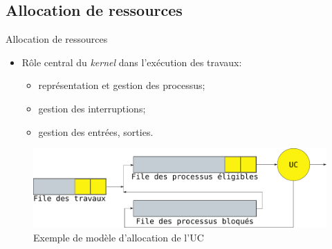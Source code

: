 \begin{frame}{\sectitle}

\def\subsectitle{Allocation de ressources}
\subsection{\subsectitle}

\begin{alertblock}{\subsectitle}
\begin{itemize}
    \item Rôle central du \textit{kernel} dans l'exécution des travaux:
    \begin{itemize}
        \item représentation et gestion des processus;
        \item gestion des interruptions;
        \item gestion des entrées, sorties.
    \end{itemize}
\end{itemize}
\end{alertblock}

\begin{figure}
\begin{center}
\includegraphics[width=\textwidth]{images/processFile.pdf}
\end{center}
\caption{Exemple de modèle d'allocation de l'UC}
\end{figure}

\end{frame}


